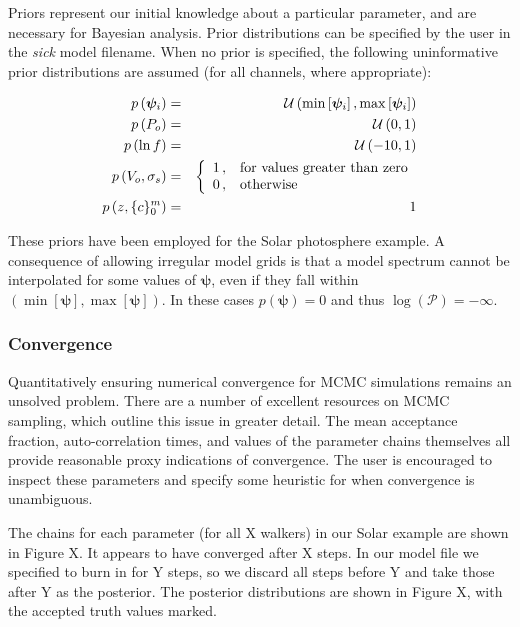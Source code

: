 \documentclass{aastex}
\newcommand{\sick}{\textit{sick}}
\begin{document}
Priors represent our initial knowledge about a particular parameter, and are necessary for Bayesian analysis. Prior distributions can be specified by the user in the \sick{} model filename. When no prior is specified, the following uninformative prior distributions are assumed (for all channels, where appropriate):

\begin{eqnarray}
p\left(\bm{\psi}_i\right) &=& \mathcal{U}\left(\min\left[\bm{\psi}_i\right], \max\left[\bm{\psi}_i\right]\right) \\
p\left(P_o\right) &=& \mathcal{U}\left(0, 1\right) \\
p\left(\ln{f}\right) &=& \mathcal{U}\left(-10, 1\right) \\
p\left(V_o,\sigma_s\right) &=& \left\{
\begin{array}{c l}      
    1\,, &\mbox{for values greater than zero}\\
    0\,, &\mbox{otherwise}
\end{array}\right. \\
p\left(z,\{c\}_0^{m}\right) &=& 1 \\
\label{eq:default_priors}
\end{eqnarray} 

These priors have been employed for the Solar photosphere example. A consequence of allowing irregular model grids is that a model spectrum cannot be interpolated for some values of $\bm{\psi}$, even if they fall within $\left(\min\left[\bm{\psi}\right], \max\left[\bm{\psi}\right]\right)$. In these cases $p\left(\bm{\psi}\right) = 0$ and thus $\log\left(\mathcal{P}\right) = -\infty$.



\subsubsection{Convergence}
Quantitatively ensuring numerical convergence for MCMC simulations remains an unsolved problem. There are a number of excellent resources on MCMC sampling, which outline this issue in greater detail. The mean acceptance fraction, auto-correlation times, and values of the parameter chains themselves all provide reasonable proxy indications of convergence. The user is encouraged to inspect these parameters and specify some heuristic for when convergence is unambiguous.

The chains for each parameter (for all X walkers) in our Solar example are shown in Figure X. It appears to have converged after X steps. In our model file we specified to burn in for Y steps, so we discard all steps before Y and take those after Y as the posterior. The posterior distributions are shown in Figure X, with the accepted truth values marked.
\end{document}
